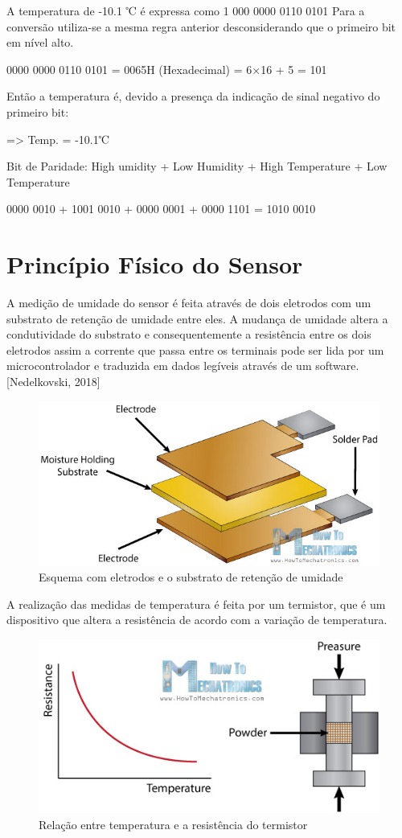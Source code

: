 A temperatura de -10.1 ℃ é expressa como 1 000 0000 0110 0101
Para a conversão utiliza-se a mesma regra anterior desconsiderando que o primeiro bit em nível alto.

0000 0000 0110 0101 = 0065H (Hexadecimal) = 6×16 + 5  = 101  

Então a temperatura é, devido a presença da indicação de sinal negativo do primeiro bit:

=> Temp. = -10.1℃ 

Bit de Paridade: High umidity + Low Humidity + High Temperature + Low Temperature

0000 0010 + 1001 0010 + 0000 0001 + 0000 1101 = 1010 0010

\section{Princípio Físico do Sensor}

A medição de umidade do sensor é feita através de dois eletrodos com um substrato de retenção de umidade entre eles. A mudança de umidade altera a condutividade do substrato e consequentemente a resistência entre os dois eletrodos assim a corrente que passa entre os terminais pode ser lida por um microcontrolador e traduzida em dados legíveis através de um software\cite{ned2017}.[Nedelkovski, 2018]

\begin{figure}[H]
	\centering
	\includegraphics[width=12cm]{figuras/humity_sensor.jpg}
	\caption{Esquema com eletrodos e o substrato de retenção de umidade}
	\label{humity_sensor}
\end{figure}

A realização das medidas de temperatura é feita por um termistor, que é um dispositivo que altera a resistência de acordo com a variação de temperatura.

\begin{figure}[H]
	\centering
	\includegraphics[width=12cm]{figuras/thermistor.jpg}
	\caption{Relação entre temperatura e a resistência do termistor}
	\label{thermistor}
\end{figure}

